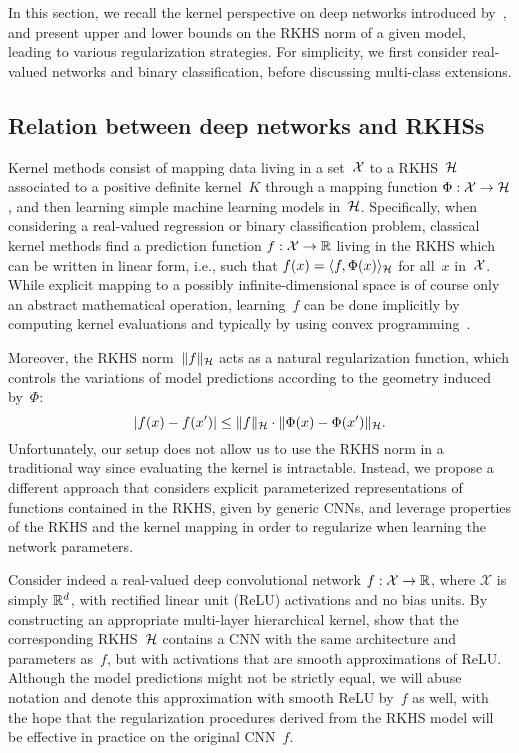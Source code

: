 
In this section, we recall the kernel perspective on deep networks introduced
by~\citet{bietti2018group}, and present upper and lower bounds on the RKHS norm
of a given model, leading to various regularization strategies.  For
simplicity, we first consider real-valued networks and binary classification,
before discussing multi-class extensions.

\subsection{Relation between deep networks and RKHSs}
\label{sub:rkhs_construction}
Kernel methods consist of mapping data living in a set~${\mathcal X}$ to a
RKHS~${\mathcal H}$ associated to a positive definite kernel~$K$ through a mapping
function $\Phi: {\mathcal X} \to {\mathcal H}$, and then learning simple machine learning
models in~${\mathcal H}$. Specifically, when considering a real-valued regression or
binary classification problem, classical kernel methods find a prediction
function $f : \mathcal{X} \to {\mathbb R}$ living in the RKHS which can be written in linear
form, i.e., such that $f(x) = \langle f, \Phi(x) \rangle_{\mathcal H}$ for all~$x$
in~${\mathcal X}$.  While explicit mapping to a possibly infinite-dimensional space is
of course only an abstract mathematical operation, learning~$f$ can be done
implicitly by computing kernel evaluations and typically by using convex
programming~\citep{scholkopf2001learning}.

Moreover, the RKHS norm~$\|f\|_{\mathcal H}$ acts as a natural regularization function,
which controls the variations of model predictions
according to the geometry induced by~$\Phi$:
\begin{equation}
\label{eq:cs}
|f(x) - f(x')| \leq \|f\|_{\mathcal H} \cdot \|\Phi(x) - \Phi(x') \|_{\mathcal H}.
\end{equation}
Unfortunately, our setup does not allow us to use the RKHS norm in a traditional way since evaluating the kernel is intractable. Instead, we
propose a different approach that considers explicit parameterized
representations of functions contained in the RKHS, given by generic CNNs,
and leverage properties of the RKHS and the
kernel mapping in order to regularize when learning the network parameters.


Consider indeed a real-valued deep convolutional network $f : \mathcal{X} \to
{\mathbb R}$, where $\mathcal X$ is simply ${\mathbb R}^d$, with rectified linear unit (ReLU) activations and no bias units.
By constructing an appropriate multi-layer hierarchical kernel, \citet{bietti2018group} show
that the corresponding RKHS~${\mathcal H}$ contains a CNN with the same architecture and parameters as~$f$,
but with activations that are smooth approximations of ReLU.
Although the model predictions might not be strictly equal, we will abuse notation and denote this
approximation with smooth ReLU by~$f$ as well,
with the hope that the regularization procedures derived from the RKHS model
will be effective in practice on the original CNN~$f$.

